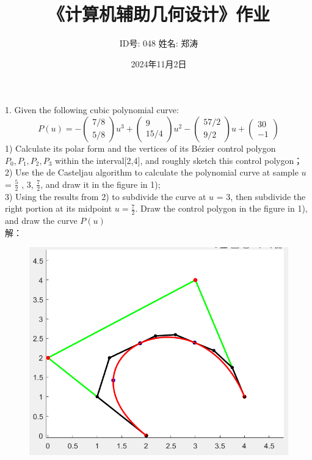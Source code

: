 \documentclass{article}
\begin{document}
	
	\title{《计算机辅助几何设计》作业}
	\author{ID号: 048  \qquad  姓名: 郑涛}  %
	\date{2024年11月2日}
	\maketitle
	
	
	1. Given the following cubic polynomial curve:\\
	\begin{equation*}
		P(u)=-\left(\begin{array}{c} 7/8\\5/8 \end{array}\right)u^3+
		\left(\begin{array}{c}	9\\15/4 \end{array}\right)u^2-
		\left(\begin{array}{c} 57/2\\9/2 \end{array}\right)u+
		\left(\begin{array}{c} 30\\-1 \end{array}\right)
	\end{equation*}
	1) Calculate its polar form and the vertices of its Bézier control polygon $P_0,P_1,P_2,P_3$
	within the interval[2,4], and roughly sketch this control polygon；\\
	2) Use the de Casteljau algorithm to calculate the polynomial curve at sample $u$ =
	{$\frac{5}{2}$ , 3, $\frac{7}{2}$}, and draw it in the figure in 1);\\
	3) Using the results from 2) to subdivide the curve at $u$ = 3, then subdivide the right 
	portion at its midpoint $u=\frac{7}{2}$. Draw the control polygon in the figure in 1), and 
	draw the curve $P(u)$\\
	解：\\
	\begin{figure}[H]
		\centering
		\includegraphics{1}
		\caption{}
		\label{fig:1}
	\end{figure}
\end{document}
